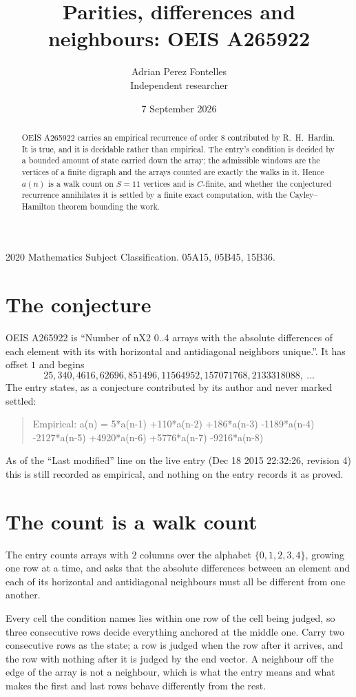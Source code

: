 \documentclass[11pt,a4paper]{article}
\title{Parities, differences and neighbours: OEIS A265922}
\author{Adrian Perez Fontelles\\ \small Independent researcher}
\date{7 September 2026}
\theoremstyle{plain}
\theoremstyle{definition}
\begin{document}
\maketitle

\begin{abstract}
OEIS A265922 carries an empirical recurrence of order $8$ contributed by R.~H.~Hardin. It is
true, and it is decidable rather than empirical. The entry's condition is decided by a bounded amount of state carried down the array; the
admissible windows are the vertices of a finite digraph and the arrays counted are exactly the
walks in it. Hence $a(n)$ is a walk count on $S=11$ vertices and is $C$-finite, and whether the
conjectured recurrence annihilates it is settled by a finite exact computation, with the
Cayley--Hamilton theorem bounding the work.
\end{abstract}

\noindent\small 2020 Mathematics Subject Classification. 05A15, 05B45, 15B36.\normalsize

\section{The conjecture}

OEIS A265922 is ``Number of nX2 0..4 arrays with the absolute differences of each element with its with horizontal and antidiagonal neighbors unique.''. It has offset $1$ and begins
\[
25, 340, 4616, 62696, 851496, 11564952, 157071768, 2133318088,\ \dots
\]
The entry states, as a conjecture contributed by its author and never marked settled:
\begin{quote}
Empirical: a(n) = 5*a(n-1) +110*a(n-2) +186*a(n-3) -1189*a(n-4) -2127*a(n-5) +4920*a(n-6) +5776*a(n-7) -9216*a(n-8)
\end{quote}
As of the ``Last modified'' line on the live entry (Dec 18 2015 22:32:26, revision 4) this is still
recorded as empirical, and nothing on the entry records it as proved.

\section{The count is a walk count}

The entry counts arrays with $2$ columns over the alphabet $\{0,1,2,3,4\}$, growing one row at a time, and asks that the absolute differences between an element and each of its horizontal and antidiagonal neighbours must all be different from one another.

Every cell the condition names lies within one row of the cell being judged, so three consecutive rows decide everything anchored at the middle one. Carry two consecutive rows as the state; a row is judged when the row after it arrives, and the row with nothing after it is judged by the end vector. A neighbour off the edge of the array is not a neighbour, which is what the entry means and what makes the first and last rows behave differently from the rest.
\end{document}

